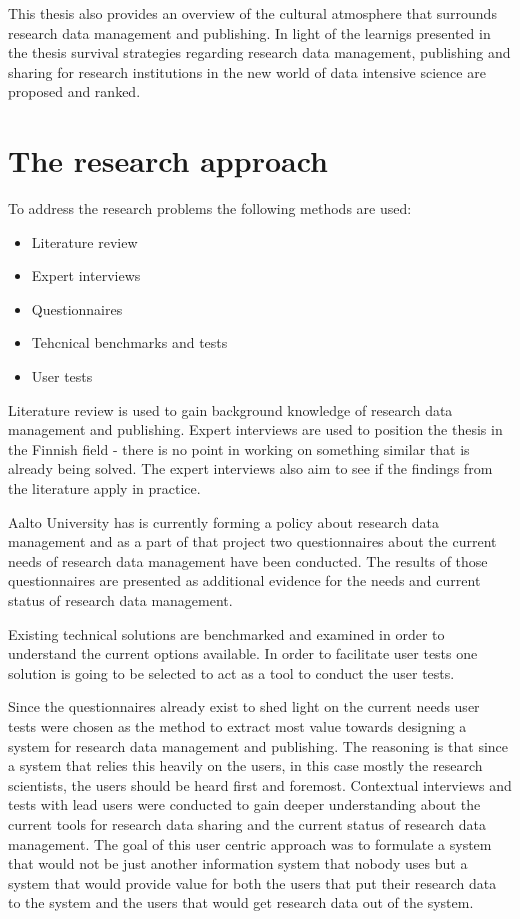 This thesis also provides an overview of the cultural atmosphere that surrounds
research data management and publishing. In light of the learnigs presented in
the thesis survival strategies regarding research data management, publishing and
sharing for research institutions in the new world of
data intensive science are proposed and ranked.

\section{The research approach}

To address the research problems the following methods are used:

\begin{itemize}
    \item Literature review
    \item Expert interviews
    \item Questionnaires
    \item Tehcnical benchmarks and tests
    \item User tests
\end{itemize}

Literature review is used to gain background knowledge of research data
management and publishing. Expert interviews are used to position the thesis
in the Finnish field - there is no point in working on something similar that
is already being solved. The expert interviews also aim to see if the findings
from the literature apply in practice.

Aalto University has is currently forming a policy about research data
management and as a part of that project two questionnaires about the
current needs of research data management have been conducted. The results of
those questionnaires are presented as additional evidence for the needs and
current status of research data management.

Existing technical solutions are benchmarked and examined in order to
understand the current options available. In order to facilitate user tests
one solution is going to be selected to act as a tool to conduct the user
tests.

Since the questionnaires already exist to shed light on the current needs user
tests were chosen as the method to extract most value towards designing a
system for research data management and publishing. The reasoning is that since
a system that relies this heavily on the users, in this case mostly the
research scientists, the users should be heard first and foremost. Contextual
interviews and tests with lead users were conducted to gain deeper
understanding about the current tools for research data sharing and the current
status of research data management. The goal of this user centric approach was
to formulate a system that would not be just another information system that
nobody uses but a system that would provide value for both the users that
put their research data to the system and the users that would get research
data out of the system.

